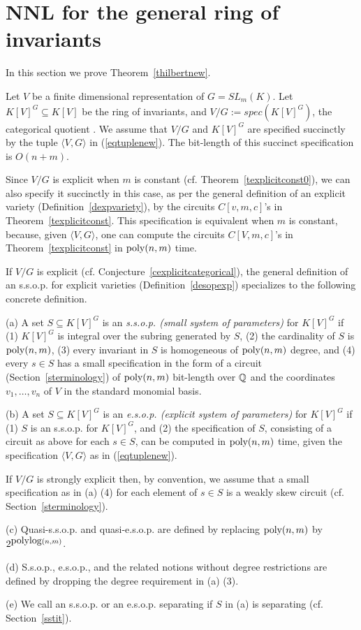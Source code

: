 \documentclass[11pt]{article}
\begin{document}
\section{NNL for the general ring of invariants} \label{snnlconstant}
In this section we prove Theorem~\ref{thilbertnew}.

Let $V$ be a finite dimensional representation of $G=SL_m(K)$.
Let $K[V]^G \subseteq K[V]$ be the ring of invariants, and $V/G:=spec(K[V]^G)$, the categorical quotient \cite{mumford}.
We assume that $V/G$ and $K[V]^G$ are specified succinctly by  the tuple 
$\langle V,G\rangle$ in  (\ref{eqtuplenew}). The bit-length of this succinct specification is $O(n+m)$.

Since $V/G$ is explicit when $m$ is constant (cf. Theorem~\ref{texplicitconst0}), 
we can also specify it succinctly in this case,
 as per the general definition of an explicit variety
(Definition~\ref{dexpvariety}), by the circuits $C[v,m,c]$'s in Theorem~\ref{texplicitconst}. 
This specification is equivalent when $m$ is constant, because, given 
$\langle V, G \rangle$,  one can compute the circuits $C[V,m,c]$'s in Theorem~\ref{texplicitconst} in ${\mbox {poly}}(n,m)$ time.

If $V/G$ is explicit (cf. Conjecture~\ref{cexplicitcategorical}),
the general definition of an s.s.o.p.  for explicit varieties  (Definition~\ref{desopexp}) 
specializes to the following  concrete definition.

\begin{defn} \label{dexplicit}

\noindent (a) 
A set  $S \subseteq K[V]^G$ is an {\em s.s.o.p. (small system of parameters)} for   $K[V]^G$ if
(1) $K[V]^G$ is integral over the subring generated by $S$,
(2) the cardinality  of $S$ is ${\mbox {poly}}(n,m)$, 
(3) every invariant in $S$ is homogeneous of ${\mbox {poly}}(n,m)$ degree, and (4) every $s \in S$  has a small specification in the form of 
a  circuit (Section~\ref{sterminology})   of ${\mbox {poly}}(n,m)$ bit-length over $\mathbb{Q}$ and the coordinates $v_1,\ldots,v_n$ of $V$
in the standard monomial basis.

\noindent (b) 
A set $S \subseteq K[V]^G$ is  an {\em e.s.o.p. (explicit system of parameters)}
for $K[V]^G$ if (1) $S$ is an s.s.o.p. for $K[V]^G$, and
(2) the specification of $S$, consisting of a 
circuit  as above for each $s \in S$, can be computed in ${\mbox {poly}}(n,m)$ time, 
given the  specification $\langle V, G\rangle$ as in (\ref{eqtuplenew}).

If $V/G$ is strongly explicit then, by convention, we assume that a small  specification as in (a) (4) for
each element of $s \in S$ is a weakly skew circuit (cf. Section~\ref{sterminology}).


\noindent (c)  Quasi-s.s.o.p. and quasi-e.s.o.p. are defined by  replacing ${\mbox {poly}}(n,m)$  by $2^{{\mbox {polylog}}(n,m)}$. 


\noindent (d) S.s.o.p., e.s.o.p., and the related notions without degree restrictions are defined by dropping 
the degree requirement in (a) (3).

\noindent (e) We call an s.s.o.p. or  an e.s.o.p. separating if $S$ in (a) is 
separating \cite{derksenbook}  (cf.  Section~\ref{sstit}).
\end{defn}
\end{document}
